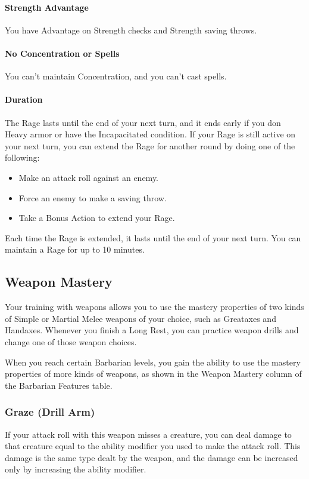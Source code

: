 \documentclass[letterpaper,openany,oneside,twocolumn]{book}
\begin{document}
\paragraph*{Strength Advantage} You have Advantage on Strength checks and Strength saving throws.

\paragraph*{No Concentration or Spells} You can't maintain Concentration, and you can't cast spells.

\paragraph*{Duration} The Rage lasts until the end of your next turn, and it ends early if you don Heavy armor or have the Incapacitated condition. If your Rage is still active on your next turn, you can extend the Rage for another round by doing one of the following:
\begin{itemize}
	\item Make an attack roll against an enemy.
	\item Force an enemy to make a saving throw.
	\item Take a Bonus Action to extend your Rage.
\end{itemize}

Each time the Rage is extended, it lasts until the end of your next turn. You can maintain a Rage for up to 10 minutes.
\subsection*{Weapon Mastery}
Your training with weapons allows you to use the mastery properties of two kinds of Simple or Martial Melee weapons of your choice, such as Greataxes and Handaxes. Whenever you finish a Long Rest, you can practice weapon drills and change one of those weapon choices.

When you reach certain Barbarian levels, you gain the ability to use the mastery properties of more kinds of weapons, as shown in the Weapon Mastery column of the Barbarian Features table.
\subsubsection*{Graze (Drill Arm)}
If your attack roll with this weapon misses a creature, you can deal damage to that creature equal to the ability modifier you used to make the attack roll. This damage is the same type dealt by the weapon, and the damage can be increased only by increasing the ability modifier.
\end{document}
